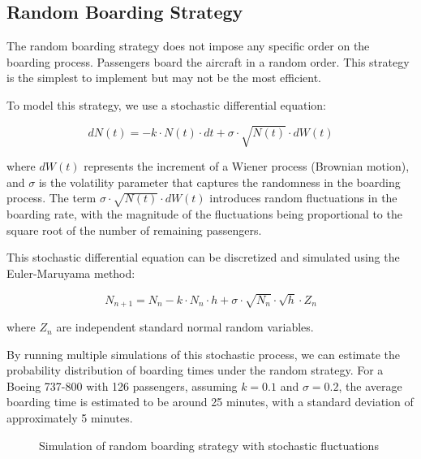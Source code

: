 \documentclass[12pt,a4paper]{article}
\begin{document}
\subsection{Random Boarding Strategy}

The random boarding strategy does not impose any specific order on the boarding process. Passengers board the aircraft in a random order. This strategy is the simplest to implement but may not be the most efficient.

To model this strategy, we use a stochastic differential equation:

\begin{equation}
dN(t) = -k \cdot N(t) \cdot dt + \sigma \cdot \sqrt{N(t)} \cdot dW(t)
\label{eq:random_boarding}
\end{equation}

where $dW(t)$ represents the increment of a Wiener process (Brownian motion), and $\sigma$ is the volatility parameter that captures the randomness in the boarding process. The term $\sigma \cdot \sqrt{N(t)} \cdot dW(t)$ introduces random fluctuations in the boarding rate, with the magnitude of the fluctuations being proportional to the square root of the number of remaining passengers.

This stochastic differential equation can be discretized and simulated using the Euler-Maruyama method:

\begin{equation}
N_{n+1} = N_n - k \cdot N_n \cdot h + \sigma \cdot \sqrt{N_n} \cdot \sqrt{h} \cdot Z_n
\label{eq:euler_maruyama}
\end{equation}

where $Z_n$ are independent standard normal random variables.

By running multiple simulations of this stochastic process, we can estimate the probability distribution of boarding times under the random strategy. For a Boeing 737-800 with 126 passengers, assuming $k = 0.1$ and $\sigma = 0.2$, the average boarding time is estimated to be around 25 minutes, with a standard deviation of approximately 5 minutes.

\begin{figure}[H]
\centering
{}
\caption{Simulation of random boarding strategy with stochastic fluctuations}
\label{fig:random_boarding}
\end{figure}
\end{document}
